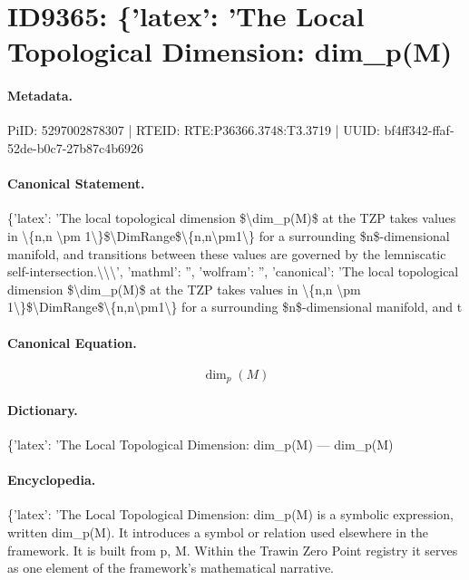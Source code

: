 \section*{ID9365: \{'latex': 'The Local Topological Dimension: dim\_p(M)}
\paragraph{Metadata.}
PiID: 5297002878307 | RTEID: RTE:P36366.3748:T3.3719 | UUID: bf4ff342-ffaf-52de-b0c7-27b87c4b6926

\paragraph{Canonical Statement.}
\{'latex': 'The local topological dimension \$\textbackslash{}dim\_p(M)\$ at the TZP takes values in \textbackslash{}\{n,n \textbackslash{}pm 1\textbackslash{}\}\$\textbackslash{}DimRange\$\textbackslash{}\{n,n\textbackslash{}pm1\textbackslash{}\} for a surrounding \$n\$-dimensional manifold, and transitions between these values are governed by the lemniscatic self-intersection.\textbackslash{}\textbackslash{}\textbackslash{}', 'mathml': '', 'wolfram': '', 'canonical': 'The local topological dimension \$\textbackslash{}dim\_p(M)\$ at the TZP takes values in \textbackslash{}\{n,n \textbackslash{}pm 1\textbackslash{}\}\$\textbackslash{}DimRange\$\textbackslash{}\{n,n\textbackslash{}pm1\textbackslash{}\} for a surrounding \$n\$-dimensional manifold, and t

\paragraph{Canonical Equation.}
\[
\dim_p(M)
\]

\paragraph{Dictionary.}
\{'latex': 'The Local Topological Dimension: dim\_p(M) — dim\_p(M)

\paragraph{Encyclopedia.}
\{'latex': 'The Local Topological Dimension: dim\_p(M) is a symbolic expression, written dim\_p(M). It introduces a symbol or relation used elsewhere in the framework. It is built from p, M. Within the Trawin Zero Point registry it serves as one element of the framework's mathematical narrative.
